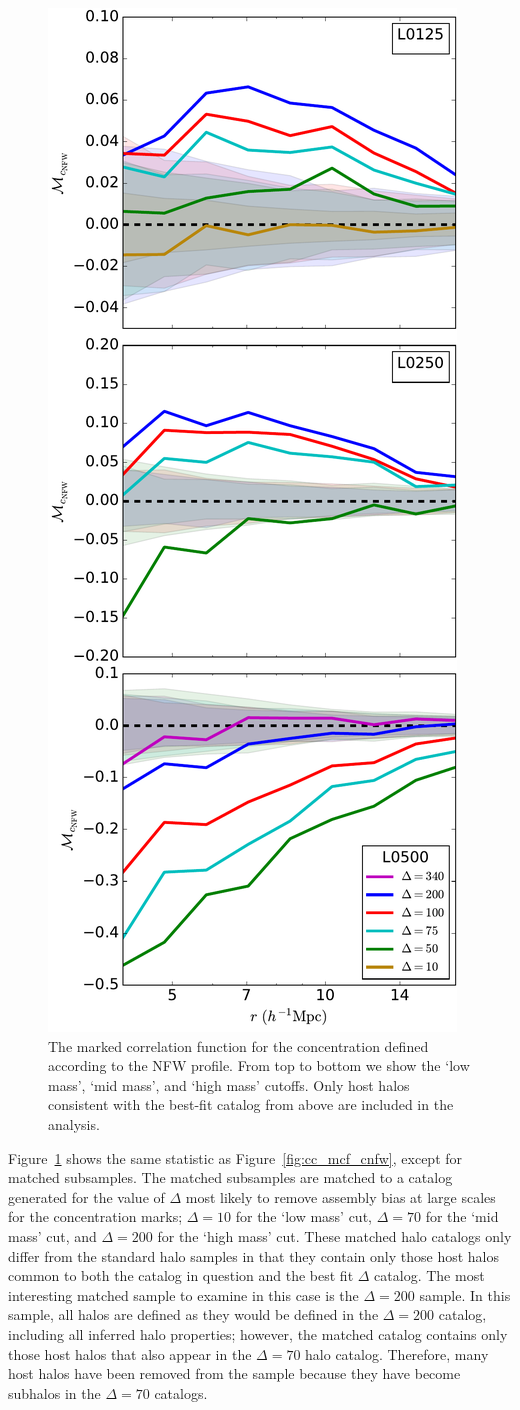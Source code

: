 \documentclass[usenatbib]{mnras}
\begin{document}
\begin{figure}
	\centering
	\includegraphics[width=.4\textwidth]{match_mcf_cNFW.pdf}
	\caption{The marked correlation function for the concentration defined according to the NFW profile. From top to bottom we show the `low mass', `mid mass', and `high mass' cutoffs. Only host halos consistent with the best-fit catalog from above are included in the analysis.}
	\label{fig:hvm_mcf_cnfw}
\end{figure}

Figure~\ref{fig:hvm_mcf_cnfw} shows the same statistic as Figure~\ref{fig:cc_mcf_cnfw}, except for matched
subsamples. The matched subsamples are matched to a catalog generated for the value of $\Delta$ most likely to
remove assembly bias at large scales for the concentration marks; $\Delta=10$ for the `low mass' cut, $\Delta=70$
for the `mid mass' cut, and $\Delta=200$ for the `high mass' cut. These matched halo catalogs only differ from
the standard halo samples in that they contain only those host halos common 
to both the catalog in question and the best fit $\Delta$ catalog. The most interesting matched sample to 
examine in this case is the $\Delta=200$ sample. In this sample, all halos are defined as they would be 
defined in the $\Delta=200$ catalog, including all inferred halo properties; however, the matched catalog 
contains only those host halos that also appear in the $\Delta=70$ halo catalog. Therefore, many host 
halos have been removed from the sample because they have become subhalos in the $\Delta=70$ 
catalogs. 
\end{document}
